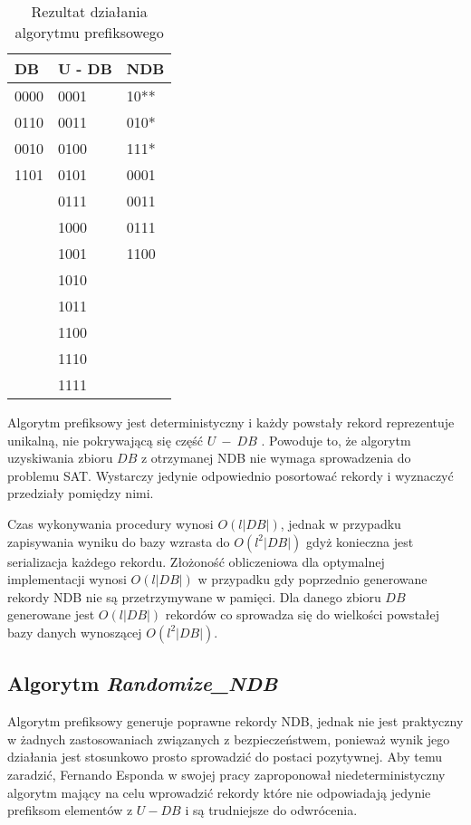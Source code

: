 \begin{table}[h]
    \centering
    \begin{tabular}{|l|l|l|}
        \hline
        DB   & U - DB & NDB  \\ \hline
        0000 & 0001   & 10** \\
        0110 & 0011   & 010* \\
        0010 & 0100   & 111* \\
        1101 & 0101   & 0001 \\
        & 0111   & 0011 \\
        & 1000   & 0111 \\
        & 1001   & 1100 \\
        & 1010   &      \\
        & 1011   &      \\
        & 1100   &      \\
        & 1110   &      \\
        & 1111   &      \\ \hline
    \end{tabular}
    \caption{Rezultat działania algorytmu prefiksowego}
    \label{tbl:prefix_results}
\end{table}



Algorytm prefiksowy jest deterministyczny i każdy powstały rekord reprezentuje unikalną, nie pokrywającą się część $U~-~DB$ \cite{NRI-Esponda}.
Powoduje to, że algorytm uzyskiwania zbioru $DB$ z otrzymanej NDB nie wymaga sprowadzenia do problemu SAT. Wystarczy jedynie odpowiednio posortować rekordy i wyznaczyć przedziały pomiędzy nimi.

Czas wykonywania procedury wynosi $O(l|DB|)$, jednak w przypadku zapisywania wyniku do bazy wzrasta do $O(l^2|DB|)$ gdyż konieczna jest serializacja każdego rekordu.
Złożoność obliczeniowa dla optymalnej implementacji wynosi $O(l|DB|)$ w przypadku gdy poprzednio generowane rekordy NDB nie są przetrzymywane w pamięci. 
Dla danego zbioru $DB$ generowane jest $O(l|DB|)$ rekordów co sprowadza się do wielkości powstałej bazy danych wynoszącej $O(l^2|DB|)$.
\subsection{Algorytm \textit{Randomize\_NDB}}
Algorytm prefiksowy generuje poprawne rekordy NDB, jednak nie jest praktyczny w żadnych zastosowaniach związanych z bezpieczeństwem, ponieważ wynik jego działania jest stosunkowo prosto sprowadzić do postaci pozytywnej. Aby temu zaradzić, Fernando Esponda w swojej pracy\cite{NRI-Esponda} zaproponował niedeterministyczny algorytm mający na celu wprowadzić rekordy które nie odpowiadają jedynie prefiksom elementów z $U - DB$ i są trudniejsze do odwrócenia.

